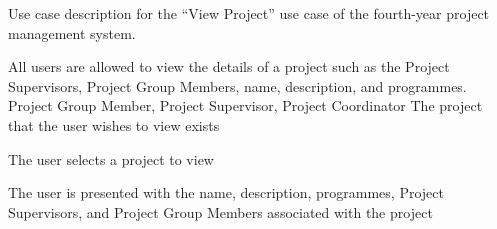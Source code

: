 \documentclass[document.tex]{subfiles}
\begin{document}
\begin{table}
  \centering
  \caption{Use case description for the ``View Project'' use case of the fourth-year project management system.}
  \label{tbl:use-case-view-project}

  \begin{usecase}
    All users are allowed to view the details of a project such as the Project Supervisors, Project Group Members, name, description, and programmes.
    Project Group Member, Project Supervisor, Project Coordinator
    The project that the user wishes to view exists
    \ucnormal
    \begin{ucenum}
      \item The user selects a project to view
      \item The user is presented with the name, description, programmes, Project Supervisors, and Project Group Members associated with the project
    \end{ucenum}
  \end{usecase}
\end{table}
\end{document}
